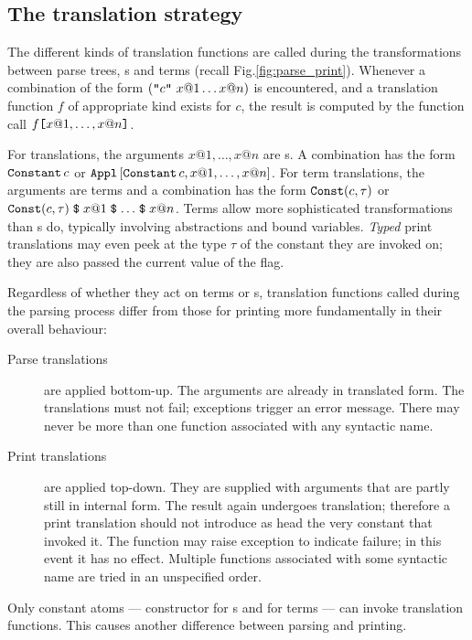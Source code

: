 \subsection{The translation strategy}
The different kinds of translation functions are called during the
transformations between parse trees, \AST{}s and terms (recall
Fig.\ts\ref{fig:parse_print}).  Whenever a combination of the form
$(\mbox{\tt "}c\mbox{\tt "}~x@1 \ldots x@n)$ is encountered, and a translation
function $f$ of appropriate kind exists for $c$, the result is
computed by the \ML{} function call $f \mbox{\tt [} x@1, \ldots, x@n \mbox{\tt ]}$.

For \AST{} translations, the arguments $x@1, \ldots, x@n$ are \AST{}s.
A combination has the form $\mathop{\mbox{\tt Constant}}\nolimits c$ or $\mathop{\mbox{\tt Appl}}\nolimits\,[\mathop{\mbox{\tt Constant}}\nolimits c, x@1,
  \ldots, x@n]$.  For term translations, the arguments are terms and a
combination has the form $\mathop{\mbox{\tt Const}}\nolimits (c, \tau)$ or $\mathop{\mbox{\tt Const}}\nolimits
(c, \tau) \mathrel{\hbox{\tt\$}} x@1 \mathrel{\hbox{\tt\$}} \ldots \mathrel{\hbox{\tt\$}} x@n$.  Terms allow more
sophisticated transformations than \AST{}s do, typically involving
abstractions and bound variables. {\em Typed} print translations may
even peek at the type $\tau$ of the constant they are invoked on; they
are also passed the current value of the  flag.

Regardless of whether they act on terms or \AST{}s, translation
functions called during the parsing process differ from those for
printing more fundamentally in their overall behaviour:
\begin{description}
\item[Parse translations] are applied bottom-up.  The arguments are already in
  translated form.  The translations must not fail; exceptions trigger an
  error message.  There may never be more than one function associated with
  any syntactic name.
  
\item[Print translations] are applied top-down.  They are supplied with
  arguments that are partly still in internal form.  The result again
  undergoes translation; therefore a print translation should not introduce as
  head the very constant that invoked it.  The function may raise exception
   to indicate failure; in this event it has no effect.  Multiple
  functions associated with some syntactic name are tried in an unspecified
  order.
\end{description}

Only constant atoms --- constructor  for \AST{}s and
 for terms --- can invoke translation functions.  This
causes another difference between parsing and printing.

